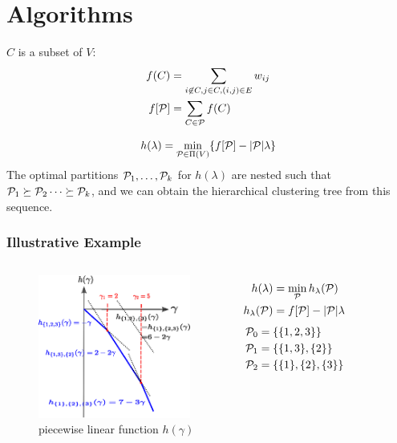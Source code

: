 \documentclass[notheorems]{beamer}
\begin{document}
\section{Algorithms}
\frame{\tableofcontents[currentsection]}
\begin{frame}
\begin{definition}
$C$ is a subset of $V$:
\begin{align}
f(C) & = \sum_{i\not\in C, j \in C, (i,j) \in E} w_{ij} \\
f[\P] & = \sum_{C \in \P} f(C)
\end{align}
\end{definition}
\begin{theorem}
\begin{equation}\label{eq:hLambda}
h(\lambda) = \min_{\P \in \Pi(V)} \{ f[\P] - \abs{\P}\lambda \}
\end{equation}
The optimal partitions $\P_1, \dots, \P_k$ for $h(\lambda)$ are nested such that $\P_1 \succeq \P_2 \dots \succeq \P_k$, and we can obtain the hierarchical clustering tree from this sequence.
\end{theorem}
\end{frame}
\begin{frame}
\frametitle{Illustrative Example}
\begin{columns}
\column{5cm}
\begin{figure}
\includegraphics[width=5cm]{pic/dt.eps}
\caption{piecewise linear function $h(\gamma)$}
\end{figure}
\column{5cm}
\begin{align*}
h(\lambda)  & = \min_{\P} h_{\lambda}(\P) \\
h_{\lambda}(\P) & = f[\P] - \abs{\P}\lambda
\end{align*}
\begin{align*}
\P_0  & = \{\{1,2,3\}\} \\
\P_1  & = \{\{1,3\},\{2\}\} \\
\P_2  & = \{\{1\},\{2\},\{3\}\} 
\end{align*}

\end{columns}
\end{frame}
\end{document}
